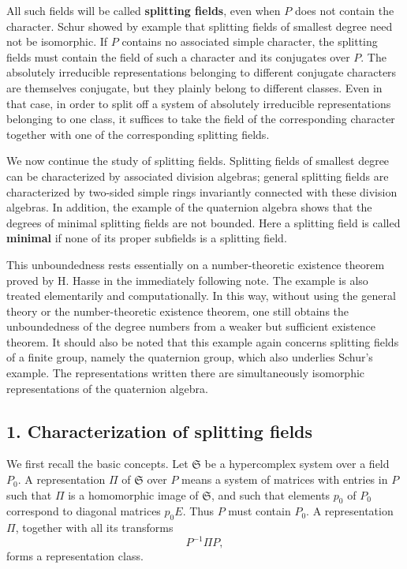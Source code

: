 \documentclass[11pt]{article}
\begin{document}
All such fields will be called \textbf{splitting fields}, even when
\(P\) does not contain the character. Schur showed by example that
splitting fields of smallest degree need not be isomorphic. If \(P\)
contains no associated simple character, the splitting fields must
contain the field of such a character and its conjugates over \(P\). The
absolutely irreducible representations belonging to different conjugate
characters are themselves conjugate, but they plainly belong to
different classes. Even in that case, in order to split off a system of
absolutely irreducible representations belonging to one class, it
suffices to take the field of the corresponding character together with
one of the corresponding splitting fields.

We now continue the study of splitting fields. Splitting fields of
smallest degree can be characterized by associated division algebras;
general splitting fields are characterized by two-sided simple rings
invariantly connected with these division algebras. In addition, the
example of the quaternion algebra shows that the degrees of minimal
splitting fields are not bounded. Here a splitting field is called
\textbf{minimal} if none of its proper subfields is a splitting field.

This unboundedness rests essentially on a number-theoretic existence
theorem proved by H. Hasse in the immediately following note. The
example is also treated elementarily and computationally. In this way,
without using the general theory or the number-theoretic existence
theorem, one still obtains the unboundedness of the degree numbers from
a weaker but sufficient existence theorem. It should also be noted that
this example again concerns splitting fields of a finite group, namely
the quaternion group, which also underlies Schur's example. The
representations written there are simultaneously isomorphic
representations of the quaternion algebra.

\subsection{1. Characterization of splitting
fields}\label{characterization-of-splitting-fields}

We first recall the basic concepts. Let \(\mathfrak S\) be a
hypercomplex system over a field \(P_0\). A representation \(\Pi\) of
\(\mathfrak S\) over \(P\) means a system of matrices with entries in
\(P\) such that \(\Pi\) is a homomorphic image of \(\mathfrak S\), and
such that elements \(p_0\) of \(P_0\) correspond to diagonal matrices
\(p_0E\). Thus \(P\) must contain \(P_0\). A representation \(\Pi\),
together with all its transforms \[
  P^{-1}\Pi P,
\] forms a representation class.
\end{document}
